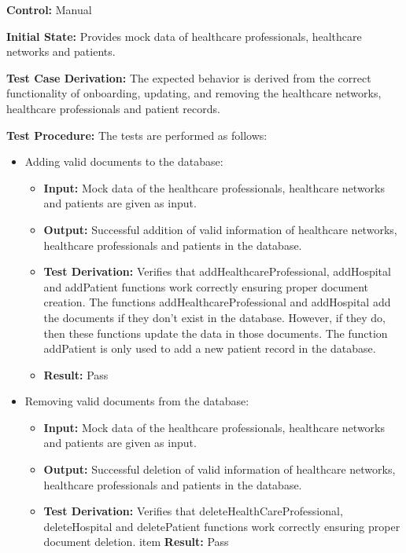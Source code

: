 \documentclass[12pt, titlepage]{article}
\begin{document}
\begin{enumerate}

  \textbf{Control:} Manual

  \textbf{Initial State:} Provides mock data of healthcare professionals, healthcare networks and patients.

  \textbf{Test Case Derivation:} The expected behavior is derived from the correct functionality of onboarding, updating, and removing the healthcare networks, healthcare professionals and patient records.

  \textbf{Test Procedure:} The tests are performed as follows:

  \begin{itemize}
    \item Adding valid documents to the database:

    \begin{itemize}
      \item \textbf{Input:} Mock data of the healthcare professionals, healthcare networks and patients are given as input.  
      \item \textbf{Output:} Successful addition of valid information of healthcare networks, healthcare professionals and patients in the database. 
      \item \textbf{Test Derivation:} Verifies that addHealthcareProfessional, addHospital and addPatient functions work correctly ensuring proper document creation. The functions addHealthcareProfessional and addHospital add the documents if they don't exist in the database. However, if they do, then these functions update the data in those documents. The function addPatient is only used to add a new patient record in the database.
      \item \textbf{Result:} Pass 
    \end{itemize}

    \item Removing valid documents from the database:

    \begin{itemize}
      \item \textbf{Input:} Mock data of the healthcare professionals, healthcare networks and patients are given as input.  
      \item \textbf{Output:} Successful deletion of valid information of healthcare networks, healthcare professionals and patients in the database. 
      \item \textbf{Test Derivation:} Verifies that deleteHealthCareProfessional, deleteHospital and deletePatient functions work correctly ensuring proper document deletion.
      item \textbf{Result:} Pass
    \end{itemize}


\end{itemize}
\end{enumerate}
\end{document}
